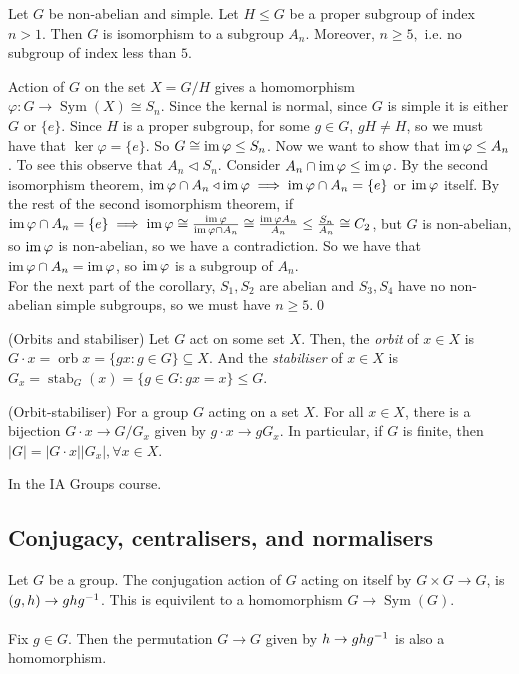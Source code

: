 \documentclass{article}
\newcommand{\nrm}{\triangleleft}
\DeclareMathOperator{\sym}{Sym}
\DeclareMathOperator{\orb}{orb}
\DeclareMathOperator{\stab}{stab}
\begin{document}
\begin{itemize}
\begin{corollary}
	  Let $ G $ be non-abelian and simple. Let $ H\le G $ be a proper subgroup of index $ n>1 $. Then $ G $ is isomorphism to a subgroup $ A_n $. Moreover, $ n\ge 5, $ i.e. no subgroup of index less than $ 5 $.
\end{corollary}
\pf Action of $ G $ on the set $ X=G/H $ gives a homomorphism $ \varphi:G\to \sym(X)\cong S_n $. Since the kernal is normal, since $ G $ is simple it is either $ G $ or $ \{e\} $. Since $ H $ is a proper subgroup, for some $ g\in G $, $ gH\ne H $, so we must have that $ \ker \varphi=\{e\} $. So $ G\cong \operatorname{im}\varphi\le S_n $. Now we want to show that $ \operatorname{im}\varphi\le A_n $. To see this observe that $ A_n\nrm S_n $. Consider $ A_n\cap \operatorname{im}\varphi\le \operatorname{im}\varphi $. By the second isomorphism theorem, $ \ima\varphi\cap A_n\nrm \ima\varphi\implies\ima\varphi\cap A_n=\{e\} $ or $ \operatorname{im}\varphi $ itself. By the rest of the second isomorphism theorem, if $ \operatorname{im}\varphi\cap A_n=\{e\}\implies \operatorname{im}\varphi\cong\frac{\operatorname{im}\varphi}{\operatorname{im}\varphi\cap A_n}\cong \frac{\operatorname{im}\varphi A_n}{A_n}\le \frac{S_n}{A_n} \cong C_2 $, but $ G $ is non-abelian, so $ \operatorname{im} \varphi $ is non-abelian, so we have a contradiction. So we have that $ \operatorname{im}\varphi\cap A_n =\operatorname{im}\varphi $, so $ \operatorname{im} \varphi $ is a subgroup of $ A_n $.\\
For the next part of the corollary, $ S_1,S_2 $ are abelian and $ S_3,S_4 $ have no non-abelian simple subgroups, so we must have $ n\ge 5 $.\qed

\begin{definition}
	(Orbits and stabiliser) Let $ G $ act on some set $ X $. Then, the \textit{orbit} of $ x\in X $ is $ G\cdot x=\orb x=\{gx : g\in G\}\subseteq X $. And the \textit{stabiliser} of $ x\in X $ is $ G_x=\stab_G(x) = \{g\in G:gx=x\}\le G $.
\end{definition}
\begin{theorem}
	(Orbit-stabiliser) For a group $ G $ acting on a set $ X $. For all $ x\in X $, there is a bijection $ G\cdot x \to G/G_x $ given by $ g\cdot x \to gG_x $. In particular, if $ G $ is finite, then $ |G|=|G\cdot x||G_x|, \forall x\in X $.
\end{theorem}
\pf In the IA Groups course.
\subsection{Conjugacy, centralisers, and normalisers}
Let $ G $ be a group. The conjugation action of $ G $ acting on itself by $ G\times G\to G $, is $ (g,h)\to gh{g}^{-1} $. This is equivilent to a homomorphism $ G\to\sym(G) $.\\\\
Fix $ g\in G $. Then the permutation $ G\to G $ given by $ h\to gh{g}^{-1} $ is also a homomorphism.


\end{itemize}
\end{document}
